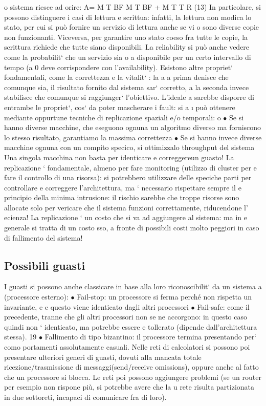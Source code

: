 \documentclass[a4paper,12pt]{article}
\begin{document}
o
sistema riesce ad orire:
A=
M T BF
M T BF + M T T R
(13)
In particolare, si possono distinguere i casi di lettura e scrittua: infatti, la lettura
non modica lo stato, per cui si può fornire un servizio di lettura anche se vi
o
sono diverse copie non funzionanti. Viceversa, per garantire uno stato coeso fra
tutte le copie, la scrittura richiede che tutte siano disponibili.
La reliability si può anche vedere come la probabilit` che un servizio sia
o
a
disponibile per un certo intervallo di tempo (a 0 deve corrispondere con l'availability).
Esistono altre propriet` fondamentali, come la correttezza e la vitalit` : la
a
a
prima denisce che comunque sia, il risultato fornito dal sistema sar` corretto,
a
la seconda invece stabilisce che comunque si raggiunger` l'obiettivo. L'ideale
a
sarebbe disporre di entrambe le propriet`, cos` da poter mascherare i fault: si
a
\i{}
può ottenere mediante oppurtune tecniche di replicazione spaziali e/o temporali:
o
$\bullet$ Se si hanno diverse macchine, che eseguono ognuna un algoritmo diverso
ma forniscono lo stesso risultato, garantiamo la massima correttezza
$\bullet$ Se si hanno invece diverse macchine ognuna con un compito specico, si
ottimizzalo throughput del sistema
Una singola macchina non basta per identicare e correggereun guasto! La
replicazione ` fondamentale, almeno per fare monitoring (utilizzo di cluster per
e
fare il controllo di una risorsa): si potrebbero utilizzare delle speciche parti
per controllare e correggere l'architettura, ma ` necessario rispettare sempre il
e
principio della minima intrusione: il rischio sarebbe che troppe risorse sono
allocate solo per vericare che il sistema funzioni correttamente, riducendone l'
ecienza! La replicazione ` un costo che si va ad aggiungere al sistema: ma in
e
generale si tratta di un costo sso, a fronte di possibili costi molto peggiori in
caso di fallimento del sistema!
\subsection{Possibili guasti}
I guasti si possono anche classicare in base alla loro riconoscibilit` da un sistema
a
(processore esterno):
$\bullet$ Fail-stop: un processore si ferma perché non rispetta un invariante, e
e
questo viene identicato dagli altri processori
$\bullet$ Fail-safe: come il precedente, tranne che gli altri processori non se ne
accorgono: in questo caso quindi non ` identicato, ma potrebbe essere
e
tollerato (dipende dall'architettura stessa).
19
$\bullet$ Fallimento di tipo bizantino: il processore termina presentando per` como
portamenti assolutamente casuali.
Nelle reti di calcolatori si possono poi presentare ulteriori generi di guasti, dovuti
alla mancata totale ricezione/trasmissione di messaggi(send/receive omissions),
oppure anche al fatto che un processore si blocca. Le reti poi possono aggiungere
problemi (se un router per esempio non rispone più, si potrebbe avere che la
u
rete risulta partizionata in due sottoreti, incapaci di comunicare fra di loro).
\end{document}
